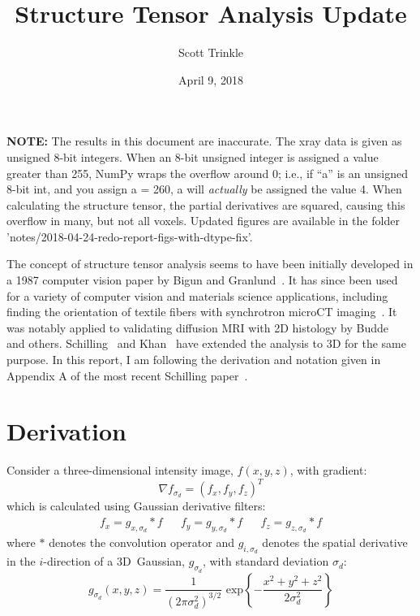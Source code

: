 \documentclass[11pt]{article}
\title{Structure Tensor Analysis Update}
\author{Scott Trinkle}
\date{April 9, 2018}
\begin{document}
\maketitle

\textbf{NOTE:} The results in this document are inaccurate. The xray data is
given as unsigned 8-bit integers. When an 8-bit unsigned integer is assigned a
value greater than 255, NumPy wraps the overflow around 0; i.e., if ``a'' is an
unsigned 8-bit int, and you assign a = 260, a will \textit{actually} be assigned
the value 4. When calculating the structure tensor, the partial derivatives are
squared, causing this overflow in many, but not all voxels. Updated figures
are available in the folder 'notes/2018-04-24-redo-report-figs-with-dtype-fix'.\newline


The concept of structure tensor analysis seems to have been initially developed
in a 1987 computer vision paper by Bigun and Granlund~\cite{Bigun1987}. It has
since been used for a variety of computer vision and materials science
applications, including finding the orientation of textile fibers with
synchrotron microCT imaging~\cite{Straumit2015}. It was notably applied to
validating diffusion MRI with 2D histology by Budde~\cite{Budde2012,Budde2013}
and others. Schilling~\cite{Schilling2016,Schilling2018} and
Khan~\cite{Khan2015} have extended the analysis to 3D for the same purpose. In
this report, I am following the derivation and notation given in Appendix A of
the most recent Schilling paper~\cite{Schilling2018}.

\section{Derivation}

Consider a three-dimensional intensity image, $f(x,y,z)$, with gradient:
\begin{equation}
  \label{eq:grad}
  \nabla f_{\sigma_d} = {\left(f_x, f_y, f_z\right)}^T
\end{equation}
which is calculated using Gaussian derivative filters:
\begin{align}
  \label{eq:gradcomps}
  f_x = g_{x,\sigma_d} \ast f & &  f_y = g_{y,\sigma_d} \ast f & &  f_z = g_{z,\sigma_d} \ast f
\end{align}
where $\ast$ denotes the convolution operator and $g_{i, \sigma_d}$ denotes the
spatial derivative in the $i$-direction of a 3D~Gaussian, $g_{\sigma_d}$, with
standard deviation $\sigma_d$:
\begin{equation}
  \label{eq:gauss}
  g_{\sigma_d}(x,y,z) = \frac{1}{\left(2\pi\sigma_d^2\right)^{3/2}}\text{ exp}\left\{-\frac{x^2 + y^2 + z^2}{2\sigma_d^2}\right\}
\end{equation}
\end{document}
